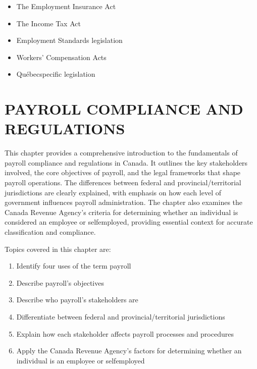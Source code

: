 \documentclass[letterpaper,10pt,english]{sphinxmanual}
\begin{document}
\begin{itemize}
\begin{itemize}
\item {} 
\sphinxAtStartPar
The Employment Insurance Act

\item {} 
\sphinxAtStartPar
The Income Tax Act

\item {} 
\sphinxAtStartPar
Employment Standards legislation

\item {} 
\sphinxAtStartPar
Workers’ Compensation Acts

\item {} 
\sphinxAtStartPar
Québec\sphinxhyphen{}specific legislation

\end{itemize}

\end{itemize}

\sphinxstepscope


\chapter{PAYROLL COMPLIANCE AND REGULATIONS}
\label{\detokenize{compliance:payroll-compliance-and-regulations}}\label{\detokenize{compliance::doc}}
\sphinxAtStartPar
{}

\sphinxAtStartPar
This chapter provides a comprehensive introduction to the fundamentals of payroll compliance and regulations in Canada.
It outlines the key stakeholders involved, the core objectives of payroll, and the legal frameworks that shape payroll
operations. The differences between federal and provincial/territorial jurisdictions are clearly explained, with emphasis on
how each level of government influences payroll administration. The chapter also examines the Canada Revenue Agency’s
criteria for determining whether an individual is considered an employee or self\sphinxhyphen{}employed, providing essential context for
accurate classification and compliance.

\sphinxAtStartPar
Topics covered in this chapter are:
\begin{enumerate}
%
\item {} 
\sphinxAtStartPar
Identify four uses of the term payroll

\item {} 
\sphinxAtStartPar
Describe payroll’s objectives

\item {} 
\sphinxAtStartPar
Describe who payroll’s stakeholders are

\item {} 
\sphinxAtStartPar
Differentiate between federal and provincial/territorial jurisdictions

\item {} 
\sphinxAtStartPar
Explain how each stakeholder affects payroll processes and procedures

\item {} 
\sphinxAtStartPar
Apply the Canada Revenue Agency’s factors for determining whether an individual is an employee or self\sphinxhyphen{}employed

\end{enumerate}
\end{document}
